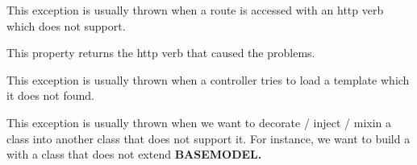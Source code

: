 \documentclass[letterpaper,10pt,english]{sphinxmanual}
\begin{document}

\begin{fulllineitems}
\label{features/exceptions:fantastico.exceptions.FantasticoHttpVerbNotSupported}
This exception is usually thrown when a route is accessed with an http verb which does not support.

\begin{fulllineitems}
\label{features/exceptions:fantastico.exceptions.FantasticoHttpVerbNotSupported.http_verb}
This property returns the http verb that caused the problems.

\end{fulllineitems}


\end{fulllineitems}


\begin{fulllineitems}
\label{features/exceptions:fantastico.exceptions.FantasticoTemplateNotFoundError}
This exception is usually thrown when a controller tries to load a template which it does not found.

\end{fulllineitems}


\begin{fulllineitems}
\label{features/exceptions:fantastico.exceptions.FantasticoIncompatibleClassError}
This exception is usually thrown when we want to decorate / inject / mixin a class into another class
that does not support it. For instance, we want to build a {\hyperref[features/mvc:fantastico.mvc.model_facade.ModelFacade]{}}
with a class that does not extend \textbf{BASEMODEL.}

\end{fulllineitems}
\end{document}

